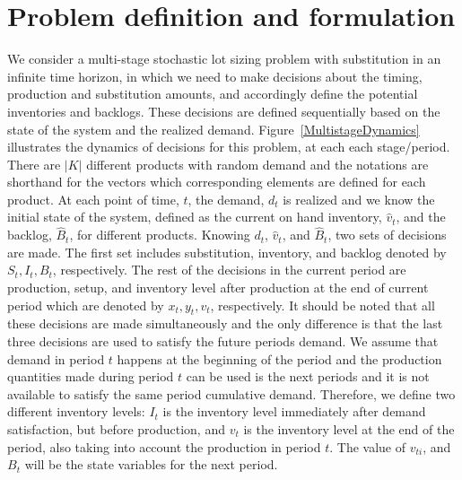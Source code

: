 \documentclass[10pt]{article}
\newcommand{\ti}{t} %
\newcommand{\KA}{K}
\newcommand{\Bi}{B} %
\newcommand{\Vi}{v} %
\newcommand{\Es}{S} %
\newcommand{\InvPos}{inventory level after production }
\begin{document}
\section{Problem definition and formulation}
We consider a  multi-stage stochastic lot sizing problem with substitution in an infinite time horizon, in which we need to make decisions about the timing, production and substitution amounts, and accordingly define the potential inventories and backlogs. 
These decisions are defined sequentially based on the state of the system and the realized demand.
Figure~\ref{MultistageDynamics} illustrates the dynamics of decisions for this problem, at each each stage/period. 
There are $|\KA|$ different products with random demand and the notations are shorthand for the vectors which corresponding elements are defined for each product.
At each point of time, $t$, the demand, $d_{\ti}$ is realized and we know the initial state of the system, defined as the current on hand inventory, $\hat{\Vi}_{\ti}$, and the backlog, $\hat{\Bi}_{\ti}$, for different products. Knowing $d_{\ti}$, $\hat{\Vi}_{\ti}$, and $\hat{\Bi}_{\ti}$, two sets of decisions are made. The first set includes substitution, inventory, and backlog denoted by $\Es_{\ti}, I_{\ti}, \Bi_{\ti}$, respectively. 
The rest of the decisions in the current period are production, setup, and \InvPos at the end of current period which are denoted by $x_{\ti}, y_{\ti}, v_{\ti}$, respectively. 
It should be noted that all these decisions are made simultaneously and the only difference is that the last three decisions are used to satisfy the future periods demand.
We assume that demand in period $\ti$ happens at the beginning of the period and the production quantities made during period $\ti$ can be used is the next periods and it is not available to satisfy the same period cumulative demand. Therefore, we define two different inventory levels: $I_{\ti}$ is the inventory level immediately after demand satisfaction, but before production, and $\Vi_{\ti}$ is the inventory level at the end of the period, also taking into account the production in period $\ti$. 
The value of $\Vi_{ti}$, and $\Bi_{\ti}$ will be the state variables for the next period. 
\end{document}
